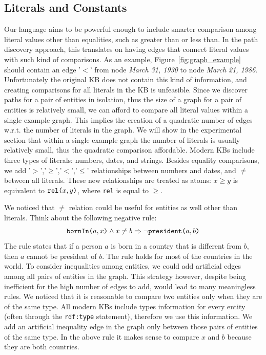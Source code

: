 \subsection{Literals and Constants}
Our language aims to be powerful enough to include smarter comparison among literal values other than equalities, such as greater than or less than. In the path discovery approach, this translates on having edges that connect literal values with such kind of comparisons. As an example, Figure~\ref{fig:graph_example} should contain an edge '$<$' from node \textit{March 31, 1930} to node \textit{March 21, 1986}. Unfortunately the original KB does not contain this kind of information, and creating comparisons for all literals in the KB is unfeasible. Since we discover paths for a pair of entities in isolation, thus the size of a graph for a pair of entities is relatively small, we can afford to compare all literal values within a single example graph. This implies the creation of a quadratic number of edges w.r.t. the number of literals in the graph. We will show in the experimental section that within a single example graph the number of literals is usually relatively small, thus the quadratic comparison affordable. Modern KBs include three types of literals: numbers, dates, and strings. Besides equality comparisons, we add '$>$','$\geq$','$<$','$\leq$' relationships between numbers and dates, and $\neq$ between all literals. These new relationships are treated as atoms: $x \geq y$ is equivalent to $\texttt{rel(}x,y\texttt{)}$, where \texttt{rel} is equal to $\geq$.

We noticed that $\neq$ relation could be useful for entities as well other than literals. Think about the following negative rule:
$$ \texttt{bornIn(}a,x\texttt{)} \wedge x \neq b \Rightarrow \neg \texttt{president(}a,b\texttt{)} $$
The rule states that if a person $a$ is born in a country that is different from $b$, then $a$ cannot be president of $b$. The rule holds for most of the countries in the world. To consider inequalities among entities, we could add artificial edges among all pairs of entities in the graph. This strategy however, despite being inefficient for the high number of edges to add, would lead to many meaningless rules. We noticed that it is reasonable to compare two entities only when they are of the same type. All modern KBs include types information for every entity (often through the \texttt{rdf:type} statement), therefore we use this information. We add an artificial inequality edge in the graph only between those pairs of entities of the same type. In the above rule it makes sense to compare $x$ and $b$ because they are both countries.

